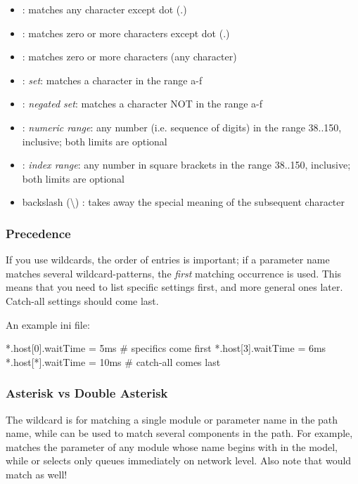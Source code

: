 \begin{itemize}
  \item {} : matches any character except dot (.)
  \item \ttt{*} : matches zero or more characters except dot (.)
  \item \ttt{**} : matches zero or more characters (any character)
  \item {} : \textit{set}: matches a character in the range a-f
  \item {}: \textit{negated set}: matches a character
    NOT in the range a-f
  \item {} : \textit{numeric range}: any number (i.e. sequence of digits)
    in the range 38..150, inclusive; both limits are optional
  \item \ttt{[38..150]} : \textit{index range}: any number in square brackets in the
    range 38..150, inclusive; both limits are optional
  \item backslash ({\textbackslash}) : takes away the special meaning of the
    subsequent character
\end{itemize}

\subsubsection{Precedence}

If you use wildcards, the order of entries is important; if a parameter
name matches several wildcard-patterns, the \textit{first} matching occurrence
is used. This means that you need to list specific settings first, and
more general ones later. Catch-all settings should come last.

An example ini file:

\begin{inifile}
[General]
*.host[0].waitTime = 5ms   # specifics come first
*.host[3].waitTime = 6ms
*.host[*].waitTime = 10ms  # catch-all comes last
\end{inifile}


\subsubsection{Asterisk vs Double Asterisk}

The \ttt{*} wildcard is for matching a single module or parameter name in the
path name, while \ttt{**} can be used to match several components in the path.
For example,  matches the  parameter of any module
whose name begins with  in the model, while 
or  selects only queues immediately on network level.
Also note that  would match 
as well!

